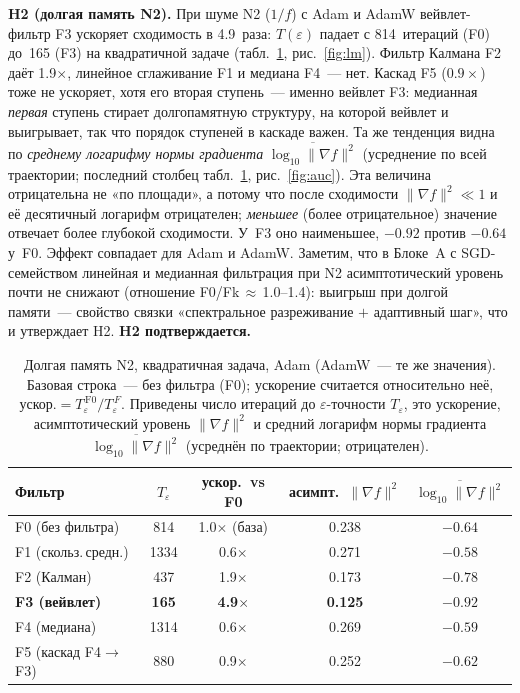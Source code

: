 \documentclass[conference]{IEEEtran}
\begin{document}
\textbf{H2 (долгая память N2).} При шуме N2 ($1/f$) с Adam и AdamW
вейвлет-фильтр F3 ускоряет сходимость в 4.9~раза: $T(\varepsilon)$
падает с 814~итераций (F0) до~165 (F3) на квадратичной задаче
(табл.~\ref{tab:h2}, рис.~\ref{fig:lm}). Фильтр Калмана F2 даёт
1.9$\times$, линейное сглаживание F1 и медиана F4~--- нет. Каскад F5
($0.9\times$) тоже не ускоряет, хотя его вторая ступень~--- именно вейвлет
F3: медианная \emph{первая} ступень стирает долгопамятную структуру, на
которой вейвлет и выигрывает, так что порядок ступеней в каскаде важен. Та же
тенденция видна по \emph{среднему логарифму нормы градиента}
$\overline{\log_{10}\|\nabla f\|^2}$ (усреднение по всей траектории;
последний столбец табл.~\ref{tab:h2}, рис.~\ref{fig:auc}). Эта величина
отрицательна не «по площади», а потому что после сходимости
$\|\nabla f\|^2\ll1$ и её десятичный логарифм отрицателен; \emph{меньшее}
(более отрицательное) значение отвечает более глубокой сходимости. У~F3
оно наименьшее, $-0.92$ против $-0.64$ у~F0. Эффект совпадает для Adam
и AdamW. Заметим, что в Блоке~A с
SGD-семейством линейная и медианная фильтрация при N2 асимптотический
уровень почти не снижают (отношение F0/Fk${\,\approx\,}$1.0--1.4):
выигрыш при долгой
памяти~--- свойство связки «спектральное разреживание $+$ адаптивный
шаг», что и утверждает H2. \textbf{H2 подтверждается.}

\begin{table}[H]
\centering\footnotesize
\setlength{\tabcolsep}{4pt}
\caption{Долгая память N2, квадратичная задача, Adam (AdamW~--- те же
значения). Базовая строка~--- без фильтра (F0); ускорение считается
относительно неё, ускор.${}=T_\varepsilon^{\,\mathrm{F0}}/T_\varepsilon^{\,F}$.
Приведены число итераций до $\varepsilon$-точности $T_\varepsilon$, это
ускорение, асимптотический уровень $\|\nabla f\|^2$ и средний логарифм
нормы градиента $\overline{\log_{10}\|\nabla f\|^2}$ (усреднён по
траектории; отрицателен).}
\label{tab:h2}
\begin{tabular}{lcccc}
\toprule
Фильтр & $T_\varepsilon$ & ускор.\ vs F0 & асимпт.\ $\|\nabla f\|^2$ & $\overline{\log_{10}\|\nabla f\|^2}$ \\
\midrule
F0 (без фильтра)     & 814 & 1.0$\times$ (база) & 0.238 & $-0.64$ \\
F1 (скольз.\,средн.) & 1334 & 0.6$\times$       & 0.271 & $-0.58$ \\
F2 (Калман)          & 437 & 1.9$\times$        & 0.173 & $-0.78$ \\
\textbf{F3 (вейвлет)} & \textbf{165} & \textbf{4.9$\times$} & \textbf{0.125} & $\mathbf{-0.92}$ \\
F4 (медиана)         & 1314 & 0.6$\times$       & 0.269 & $-0.59$ \\
F5 (каскад F4$\to$F3) & 880 & 0.9$\times$       & 0.252 & $-0.62$ \\
\bottomrule
\end{tabular}
\end{table}
\end{document}
